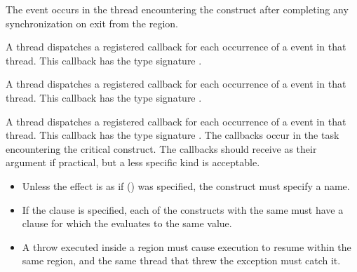 The  event occurs in the thread encountering the
 construct after completing any synchronization
on exit from the  region.

\tools
A thread dispatches a registered 
callback for each occurrence of a  event
in that thread.
This callback has the type signature .

A thread dispatches a registered 
callback for each occurrence of a  event
in that thread.  This callback has the type signature .

A thread dispatches a registered 
callback for each occurrence of a  event
in that thread.  This callback has the type signature .
The callbacks occur in the task encountering
the critical construct.  The callbacks should receive 
as their  argument if practical, but a less specific kind is acceptable.


\restrictions
\begin{itemize}
\item Unless the effect is as if () was specified, the  construct must specify a name.
\item If the  clause is specified, each of the
   constructs with the same  must have a
   clause for which the  evaluates to the same
  value.

\end{itemize}

\begin{cppspecific}
\begin{itemize}
\item A throw executed inside a  region must cause execution to resume within
the same  region, and the same thread that threw the exception must catch
it.
\end{itemize}
\end{cppspecific}


